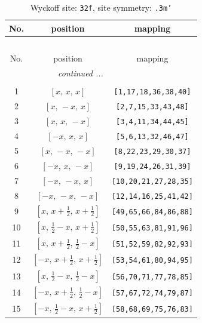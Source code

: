 \documentclass[fleqn,8pt]{jsarticle}
\begin{document}
\begin{longtable}{ccc}
\caption{Wyckoff site: {\tt 32f}, site symmetry: {\tt .3m'}}
 \\
 \hline \hline
No. & position & mapping \\ \hline \endfirsthead

\multicolumn{2}{l}{\tablename\ \thetable{}} \\
 \hline \hline
No. & position & mapping \\ \hline \endhead

 \hline \hline
\multicolumn{2}{r}{\footnotesize\it continued ...} \\ \endfoot

 \hline \hline
\multicolumn{2}{r}{} \\ \endlastfoot

1 & $\left[ x,\, x,\, x \right]$ & {\tt [1,17,18,36,38,40]} \\ \hline
2 & $\left[ x,\, - x,\, x \right]$ & {\tt [2,7,15,33,43,48]} \\ \hline
3 & $\left[ x,\, x,\, - x \right]$ & {\tt [3,4,11,34,44,45]} \\ \hline
4 & $\left[ - x,\, x,\, x \right]$ & {\tt [5,6,13,32,46,47]} \\ \hline
5 & $\left[ x,\, - x,\, - x \right]$ & {\tt [8,22,23,29,30,37]} \\ \hline
6 & $\left[ - x,\, x,\, - x \right]$ & {\tt [9,19,24,26,31,39]} \\ \hline
7 & $\left[ - x,\, - x,\, x \right]$ & {\tt [10,20,21,27,28,35]} \\ \hline
8 & $\left[ - x,\, - x,\, - x \right]$ & {\tt [12,14,16,25,41,42]} \\ \hline
9 & $\left[ x,\, x + \frac{1}{2},\, x + \frac{1}{2} \right]$ & {\tt [49,65,66,84,86,88]} \\ \hline
10 & $\left[ x,\, \frac{1}{2} - x,\, x + \frac{1}{2} \right]$ & {\tt [50,55,63,81,91,96]} \\ \hline
11 & $\left[ x,\, x + \frac{1}{2},\, \frac{1}{2} - x \right]$ & {\tt [51,52,59,82,92,93]} \\ \hline
12 & $\left[ - x,\, x + \frac{1}{2},\, x + \frac{1}{2} \right]$ & {\tt [53,54,61,80,94,95]} \\ \hline
13 & $\left[ x,\, \frac{1}{2} - x,\, \frac{1}{2} - x \right]$ & {\tt [56,70,71,77,78,85]} \\ \hline
14 & $\left[ - x,\, x + \frac{1}{2},\, \frac{1}{2} - x \right]$ & {\tt [57,67,72,74,79,87]} \\ \hline
15 & $\left[ - x,\, \frac{1}{2} - x,\, x + \frac{1}{2} \right]$ & {\tt [58,68,69,75,76,83]} \\ \hline

\end{longtable}
\end{document}
